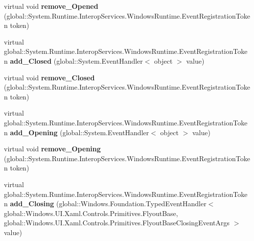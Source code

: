 \begin{DoxyCompactItemize}
virtual void {\bfseries remove\+\_\+\+Opened} (global\+::\+System.\+Runtime.\+Interop\+Services.\+Windows\+Runtime.\+Event\+Registration\+Token token)
\item 
\mbox{\label{class_windows_1_1_u_i_1_1_xaml_1_1_controls_1_1_primitives_1_1_flyout_base_a5f48a350689b2ef057ac2a870cfbbc9f}} 
virtual global\+::\+System.\+Runtime.\+Interop\+Services.\+Windows\+Runtime.\+Event\+Registration\+Token {\bfseries add\+\_\+\+Closed} (global\+::\+System.\+Event\+Handler$<$ object $>$ value)
\item 
\mbox{\label{class_windows_1_1_u_i_1_1_xaml_1_1_controls_1_1_primitives_1_1_flyout_base_a910f4919b18377849ddf436963142092}} 
virtual void {\bfseries remove\+\_\+\+Closed} (global\+::\+System.\+Runtime.\+Interop\+Services.\+Windows\+Runtime.\+Event\+Registration\+Token token)
\item 
\mbox{\label{class_windows_1_1_u_i_1_1_xaml_1_1_controls_1_1_primitives_1_1_flyout_base_a8dbfb4d3df5e017a006229b035558c61}} 
virtual global\+::\+System.\+Runtime.\+Interop\+Services.\+Windows\+Runtime.\+Event\+Registration\+Token {\bfseries add\+\_\+\+Opening} (global\+::\+System.\+Event\+Handler$<$ object $>$ value)
\item 
\mbox{\label{class_windows_1_1_u_i_1_1_xaml_1_1_controls_1_1_primitives_1_1_flyout_base_a24e892a50720e9b950a86332383a641c}} 
virtual void {\bfseries remove\+\_\+\+Opening} (global\+::\+System.\+Runtime.\+Interop\+Services.\+Windows\+Runtime.\+Event\+Registration\+Token token)
\item 
\mbox{\label{class_windows_1_1_u_i_1_1_xaml_1_1_controls_1_1_primitives_1_1_flyout_base_a048b76cc08a938c4371b9bc74777d73a}} 
virtual global\+::\+System.\+Runtime.\+Interop\+Services.\+Windows\+Runtime.\+Event\+Registration\+Token {\bfseries add\+\_\+\+Closing} (global\+::\+Windows.\+Foundation.\+Typed\+Event\+Handler$<$ global\+::\+Windows.\+U\+I.\+Xaml.\+Controls.\+Primitives.\+Flyout\+Base, global\+::\+Windows.\+U\+I.\+Xaml.\+Controls.\+Primitives.\+Flyout\+Base\+Closing\+Event\+Args $>$ value)

\end{DoxyCompactItemize}
